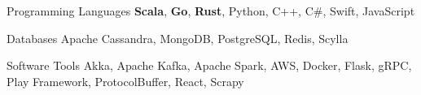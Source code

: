 

\begin{cvskills}

  \cvskill
    {Programming Languages} %
    {{\bf Scala}, {\bf Go}, {\bf Rust}, Python, C++, C\#, Swift, JavaScript} %

  \cvskill
    {Databases} %
    {Apache Cassandra, MongoDB, PostgreSQL, Redis, Scylla} %

  \cvskill
    {Software Tools} %
    {Akka, Apache Kafka, Apache Spark, AWS, Docker, Flask, gRPC, Play Framework, ProtocolBuffer, React, Scrapy} %

\end{cvskills}
